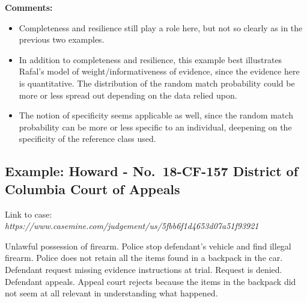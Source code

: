 \documentclass[
  10pt,
  dvipsnames,enabledeprecatedfontcommands]{scrartcl}
\providecommand{\tightlist}{%
  \setlength{\itemsep}{0pt}\setlength{\parskip}{0pt}}
\begin{document}

\textbf{Comments:}

\begin{itemize}
\tightlist
\item
  Completeness and resilience still play a role here, but not so clearly
  as in the previous two examples.
\end{itemize}


\begin{itemize}
\tightlist
\item
  In addition to completeness and resilience, this example best
  illustrates Rafal's model of weight/informativeness of evidence, since
  the evidence here is quantitative. The distribution of the random
  match probability could be more or less spread out depending on the
  data relied upon.
\end{itemize}


\begin{itemize}
\tightlist
\item
  The notion of specificity seems applicable as well, since the random
  match probability can be more or less specific to an individual,
  deepening on the specificity of the reference class used.
\end{itemize}


\hypertarget{example-howard---no.-18-cf-157-district-of-columbia-court-of-appeals}{%
\subsection{Example: Howard - No.~18-CF-157 District of Columbia Court
of
Appeals}\label{example-howard---no.-18-cf-157-district-of-columbia-court-of-appeals}}

Link to case:
\textit{https://www.casemine.com/judgement/us/5fbb6f1d4653d07a51f93921}

Unlawful possession of firearm. Police stop defendant's vehicle and find
illegal firearm. Police does not retain all the items found in a
backpack in the car. Defendant request missing evidence instructions at
trial. Request is denied. Defendant appeals. Appeal court rejects
because the items in the backpack did not seem at all relevant in
understanding what happened.
\end{document}
